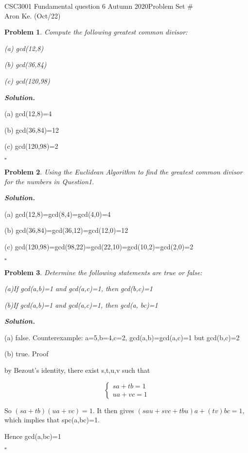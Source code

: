 \documentclass[12pt]{article}
\newtheorem{problem}{Problem}
\newenvironment{solution}[1][\it{Solution}]{\textbf{#1. } }{$\square$}
\begin{document}
\noindent CSC3001 Fundamental question 6 Autumn 2020\hfill Problem Set \#\\
Aron Ke. (Oct/22)

\hrulefill


\begin{problem}
Compute the following greatest common divisor:

(a) gcd(12,8)

(b) gcd(36,84)

(c) gcd(120,98)

\end{problem}

\begin{solution}

(a) gcd(12,8)=4

(b) gcd(36,84)=12

(c) gcd(120,98)=2

\end{solution}

\begin{problem}
  Using the Euclidean Algorithm to find the greatest common divisor for the numbers in Question1.
\end{problem}

\begin{solution}

(a) gcd(12,8)=gcd(8,4)=gcd(4,0)=4

(b) gcd(36,84)=gcd(36,12)=gcd(12,0)=12

(c) gcd(120,98)=gcd(98,22)=gcd(22,10)=gcd(10,2)=gcd(2,0)=2

\end{solution}

\begin{problem}
  Determine the following statements are true or false:

  (a)If gcd(a,b)=1 and gcd(a,c)=1, then gcd(b,c)=1

  (b)If gcd(a,b)=1 and gcd(a,c)=1, then gcd(a, bc)=1
\end{problem}

\begin{solution}

(a) false. Counterexample: a=5,b=4,c=2, gcd(a,b)=gcd(a,c)=1 but gcd(b,c)=2

(b) true. Proof

by Bezout’s identity, there exist s,t,u,v such that

$$\begin{cases}
  sa+tb=1\\
  ua+vc=1
\end{cases}$$

So $(sa+tb)(ua+vc)=1$. It then gives $(sau+svc+tbu)a+(tv)bc=1$, which implies that spc(a,bc)=1.

Hence gcd(a,bc)=1

\end{solution}
\end{document}
